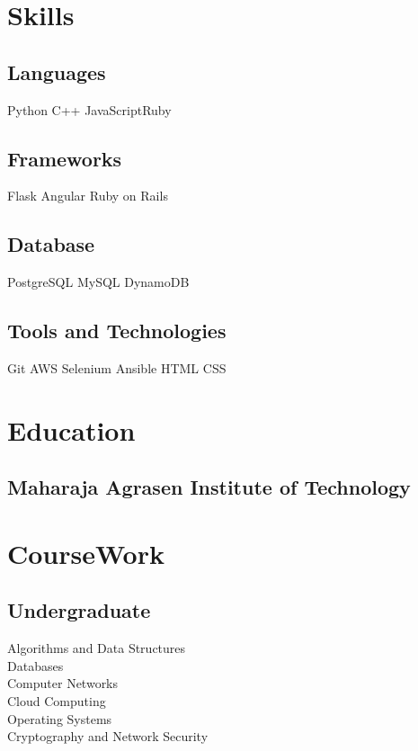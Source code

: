 \documentclass[letterpaper]{main}
\begin{document}
\begin{minipage}[t]{0.29\textwidth}

\section{Skills}
\subsection{Languages}
Python \textbullet{}C++ \textbullet{} JavaScript\textbullet{}Ruby
\sectionspace
\subsection{Frameworks}
 Flask \textbullet{} Angular\textbullet{} Ruby on Rails
\sectionspace
\subsection{Database}
 PostgreSQL \textbullet{} MySQL\textbullet{} DynamoDB
\sectionspace
\subsection{Tools and Technologies}
 Git \textbullet{} AWS\textbullet{} Selenium\textbullet{} Ansible\textbullet{} HTML\textbullet{} CSS
\sectionspace


\section{Education} 
\subsection{Maharaja Agrasen Institute of Technology}


\section{CourseWork}
\sectionspace
\subsection{Undergraduate}
\sectionspace
Algorithms and Data Structures \\
Databases\\
Computer Networks \\
Cloud Computing \\
Operating Systems \\
Cryptography and Network Security \\
\sectionspace

\end{minipage}
\end{document}
